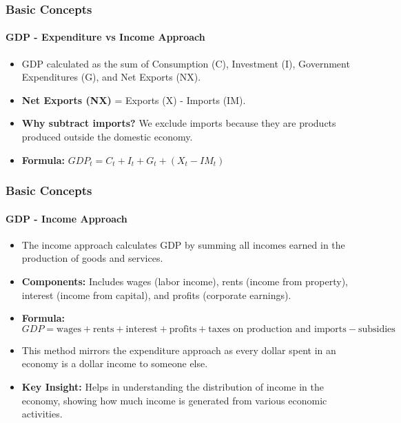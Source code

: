 \documentclass{beamer}
\begin{document}
    \begin{frame}
        \frametitle{Basic Concepts}
        \framesubtitle{GDP - Expenditure vs Income Approach}
            \begin{itemize}
                \item GDP calculated as the sum of Consumption (C), Investment (I), Government Expenditures (G), and Net Exports (NX).
                \item \textbf{Net Exports (NX)} = Exports (X) - Imports (IM).
                \item \textbf{Why subtract imports?} We exclude imports because they are products produced outside the domestic economy.
                \item \textbf{Formula:} $GDP_t = C_t + I_t + G_t + (X_t - IM_t)$
            \end{itemize}
        \end{frame}

        \begin{frame}
            \frametitle{Basic Concepts}
            \framesubtitle{GDP - Income Approach}
                \begin{itemize}
                    \item The income approach calculates GDP by summing all incomes earned in the production of goods and services.
                    \item \textbf{Components:} Includes wages (labor income), rents (income from property), interest (income from capital), and profits (corporate earnings).
                    \item \textbf{Formula:} $GDP = \text{wages} + \text{rents} + \text{interest} + \text{profits} + \text{taxes on production and imports} - \text{subsidies}$
                    \item This method mirrors the expenditure approach as every dollar spent in an economy is a dollar income to someone else.
                    \item \textbf{Key Insight:} Helps in understanding the distribution of income in the economy, showing how much income is generated from various economic activities.
                \end{itemize}
            \end{frame}
            
\end{document}
